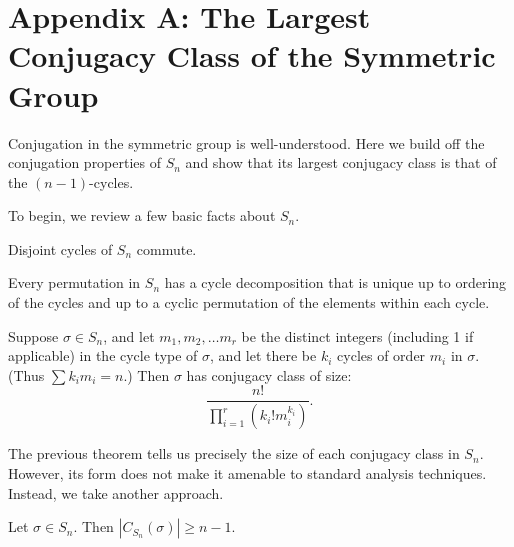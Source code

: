 \documentclass[main.tex]{subfiles}
\begin{document}
\chapter{Appendix A: The Largest Conjugacy Class of the Symmetric Group}

Conjugation in the symmetric group is well-understood. Here we build off the conjugation properties of $S_n$ and show that its largest conjugacy class is that of the $(n-1)$-cycles.

To begin, we review a few basic facts about $S_n$.

\begin{theorem}
Disjoint cycles of $S_n$ commute.
\end{theorem}

\begin{theorem}
Every permutation in $S_n$ has a cycle decomposition that is unique up to ordering of the cycles and up to a cyclic permutation of the elements within each cycle.
\end{theorem}

\begin{theorem}\label{permutationclasssize}
Suppose $\sigma \in S_n$, and let $m_1, m_2, \ldots m_r$ be the distinct integers (including 1 if applicable) in the cycle type of $\sigma$, and let there be $k_i$ cycles of order $m_i$ in $\sigma$. (Thus $\sum k_i m_i = n$.) Then $\sigma$ has conjugacy class of size:
$$\frac{n!}{\prod_{i=1}^r (k_i!m_i^{k_i})}\text{.}$$
\end{theorem}

The previous theorem tells us precisely the size of each conjugacy class in $S_n$. However, its form does not make it amenable to standard analysis techniques. Instead, we take another approach.

\begin{lemma}\label{permutationcentralizer}
Let $\sigma \in S_n$. Then $|C_{S_n}(\sigma)| \ge n - 1$.
\end{lemma}
\end{document}
